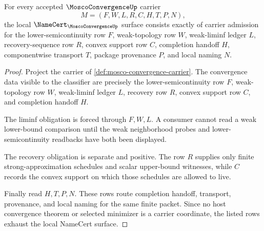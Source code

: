 \begin{theorem}
\label{thm:mosco-convergence-namecert-obligations}
For every accepted $\MoscoConvergenceUp$ carrier
$$
M=(F,W,L,R,C,H,T,P,N),
$$
the local $\NameCert_{\MoscoConvergenceUp}$ surface consists exactly of carrier admission for the lower-semicontinuity row $F$, weak-topology row $W$, weak-liminf ledger $L$, recovery-sequence row $R$, convex support row $C$, completion handoff $H$, componentwise transport $T$, package provenance $P$, and local naming $N$.
\end{theorem}
\begin{proof}
Project the carrier of \autoref{def:mosco-convergence-carrier}. The convergence data visible to the classifier are precisely the lower-semicontinuity row $F$, weak-topology row $W$, weak-liminf ledger $L$, recovery row $R$, convex support row $C$, and completion handoff $H$.

The liminf obligation is forced through $F,W,L$. A consumer cannot read a weak lower-bound comparison until the weak neighborhood probes and lower-semicontinuity readbacks have both been displayed.

The recovery obligation is separate and positive. The row $R$ supplies only finite strong-approximation schedules and scalar upper-bound witnesses, while $C$ records the convex support on which those schedules are allowed to live.

Finally read $H,T,P,N$. These rows route completion handoff, transport, provenance, and local naming for the same finite packet. Since no host convergence theorem or selected minimizer is a carrier coordinate, the listed rows exhaust the local NameCert surface.
\end{proof}

